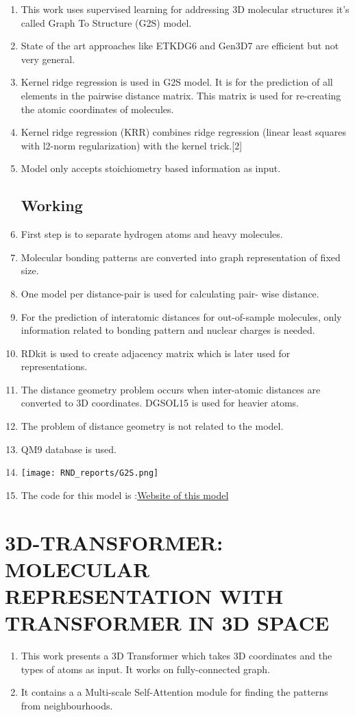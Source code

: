 \documentclass[]{report}
\begin{document}
\begin{enumerate}
    \item This work uses supervised learning for addressing 3D molecular structures it's called Graph To Structure (G2S) model.
    \item State of the art approaches like ETKDG6 and Gen3D7 are efficient but not very general.
    \item Kernel ridge regression is used in G2S model. It is for the prediction of all elements in the pairwise distance matrix. This matrix is used for re-creating the atomic coordinates of molecules. 
    \item Kernel ridge regression (KRR) combines ridge regression (linear least squares with l2-norm regularization) with the kernel trick.[2]
    \item Model only accepts stoichiometry based information as input.
   
    \subsection{Working}	
    \item First step is to separate hydrogen atoms and heavy molecules.
    \item Molecular bonding patterns are converted into graph representation of fixed size.
    \item One model per distance-pair is used for calculating pair- wise distance. 
    \item For the prediction of interatomic distances for out-of-sample molecules, only information related to bonding pattern and nuclear charges is needed.
    \item RDkit is used to create adjacency matrix which is later used for representations.
    \item The distance geometry problem occurs when inter-atomic distances are converted to 3D coordinates. DGSOL15 is used for heavier atoms.
    \item The problem of distance geometry is not related to the model.
    \item QM9 database is used.
	 \item 	\texttt{[image: RND\_reports/G2S.png]}
	 \item The code for this model is :\href{https://zenodo.org/record/4792292#.YZvsq5HMLRY}{Website of this model}
\end{enumerate}
	 
	 
	
\section{3D-TRANSFORMER: MOLECULAR REPRESENTATION WITH TRANSFORMER IN 3D SPACE}
\begin{enumerate}
    \item This work presents a 3D Transformer which takes 3D coordinates and the types of atoms as input. It works on fully-connected graph. 
    \item It contains a a Multi-scale Self-Attention module for finding the patterns from neighbourhoods.
\end{enumerate}
	 
\end{document}
